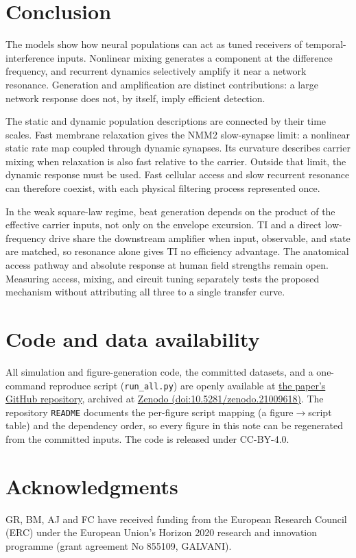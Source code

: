 \documentclass[11pt,a4paper]{article}
\begin{document}
\section{Conclusion}
The models show how neural populations can act as tuned receivers of temporal-interference
inputs. Nonlinear mixing generates a component at the difference frequency, and recurrent
dynamics selectively amplify it near a network resonance. Generation and amplification are
distinct contributions: a large network response does not, by itself, imply efficient
detection.

The static and dynamic population descriptions are connected by their time scales.
Fast membrane relaxation gives the NMM2 slow-synapse limit: a nonlinear static rate
map coupled through dynamic synapses. Its curvature describes carrier mixing when
relaxation is also fast relative to the carrier. Outside that limit, the dynamic
response must be used. Fast cellular access and slow recurrent resonance can
therefore coexist, with each physical filtering process represented once.

In the weak square-law regime, beat generation depends on the product of the
effective carrier inputs, not only on the envelope excursion. TI and a direct
low-frequency drive share the downstream amplifier when input, observable, and
state are matched, so resonance alone gives TI no efficiency advantage. The
anatomical access pathway and absolute response at human field strengths remain
open. Measuring access, mixing, and circuit tuning separately tests the proposed
mechanism without attributing all three to a single transfer curve.

\section*{Code and data availability}
All simulation and figure-generation code, the committed datasets, and a one-command
reproduce script (\texttt{run\_all.py}) are openly available at
\href{https://github.com/giulioruffini/TI-demodulation-paper}{the paper's GitHub repository}, archived at
\href{https://doi.org/10.5281/zenodo.21009618}{Zenodo (doi:10.5281/zenodo.21009618)}.
The repository \texttt{README} documents the per-figure script mapping (a
figure$\rightarrow$script table) and the dependency order, so every figure in this note can
be regenerated from the committed inputs. The code is released under CC-BY-4.0.

\section*{Acknowledgments}
GR, BM, AJ and FC have received funding from the European Research Council (ERC) under the
European Union's Horizon 2020 research and innovation programme (grant agreement No 855109,
GALVANI).
\end{document}
